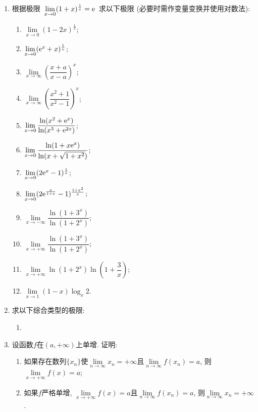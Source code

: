 \documentclass[UTF8,a4paper,20pt]{article}
\begin{document}
\begin{enumerate}[1.]
\item 根据极限~$\lim\limits_{x\to0}(1+x)^{\frac{1}{x}}=\mathrm{e}$~求以下极限 (必要时需作变量变换并使用对数法): 
	\begin{multicols}{2}
	\begin{enumerate}[(1)]
	\item $\lim\limits_{x\to 0}(1-2x)^{\frac{1}{x}}$; 
	\item $\lim\limits_{x\to 0}(\mathrm{e}^x+x)^{\frac{1}{x}}$; 
	\item $\lim\limits_{x\to\infty}\left(\dfrac{x+a}{x-a}\right)^x$; 
	\item $\lim\limits_{x\to\infty}\left(\dfrac{x^2+1}{x^2-1}\right)^x$; 
	\item $\lim\limits_{x\to 0} \dfrac{\ln(x^2+\mathrm{e}^x)}{\ln(x^3+\mathrm{e}^{2x})}$; 
	\item $\lim\limits_{x\to 0} \dfrac{\ln(1+x\mathrm{e}^x)}{\ln(x+\sqrt{1+x^2})}$; 
	\item $\lim\limits_{x\to 0}(2\mathrm{e}^x-1)^{\frac{1}{x}}$; 
	\item $\lim\limits_{x\to 0}(2\mathrm{e}^{\frac{x}{1+x}}-1)^{\frac{1+x^2}{x}}$; 
	\item $\lim\limits_{x\to -\infty} \dfrac{\ln(1+3^x)}{\ln(1+2^x)}$; 
	\item $\lim\limits_{x\to +\infty} \dfrac{\ln(1+3^x)}{\ln(1+2^x)}$; 
	\item $\lim\limits_{x\to +\infty} \ln(1+2^x)\ln(1+\dfrac{3}{x})$; 
	\item $\lim\limits_{x\to 1} (1-x)\log_x2$.
	\end{enumerate}
	\end{multicols} 

\item 求以下综合类型的极限: 
	\begin{multicols}{2}
	\begin{enumerate}[(1)]
	\item 
	\end{enumerate}
	\end{multicols}
\item 设函数$f$在$(a,+\infty)$上单增. 证明:
	\begin{enumerate}[(1)]
	\item 如果存在数列$\{x_n\}$使$\lim\limits_{n\to\infty}x_n=+\infty$且$\lim\limits_{n\to\infty}f(x_n)=a$, 则$\lim\limits_{x\to+\infty}f(x)=a$;
	\item 如果$f$严格单增, $\lim\limits_{x\to+\infty}f(x)=a$且$\lim\limits_{n\to\infty}f(x_n)=a$, 则$\lim\limits_{n\to\infty}x_n=+\infty$.
	\end{enumerate}


\end{enumerate}
\end{document}

